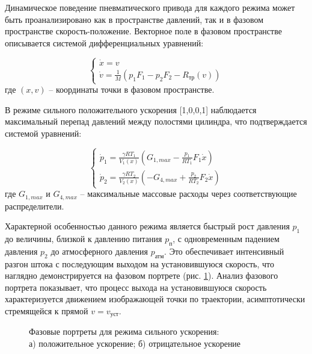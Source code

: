 Динамическое поведение пневматического привода для каждого режима может быть
проанализировано как в пространстве давлений, так и в фазовом пространстве
скорость-положение. Векторное поле в фазовом пространстве описывается системой дифференциальных уравнений:

\begin{equation}
	\begin{cases}
		\dot{x} = v \\
		\dot{v} = \frac{1}{M}(p_1F_1 - p_2F_2 - R_\text{тр}(v))
	\end{cases}
\end{equation}
где $(x,v)$ -- координаты точки в фазовом пространстве.

В режиме сильного положительного ускорения [1,0,0,1] наблюдается максимальный
перепад давлений между полостями цилиндра, что подтверждается системой уравнений:

\begin{equation*}
	\begin{cases}
		\dot{p}_1 = \frac{\gamma RT_1}{V_1(x)}\left(G_{1,max} - \frac{p_1}{RT_1}F_1\dot{x}\right) \\
		\dot{p}_2 = \frac{\gamma RT_2}{V_2(x)}\left(-G_{4,max} + \frac{p_2}{RT_2}F_2\dot{x}\right)
	\end{cases}
\end{equation*}
где $G_{1,max}$ и $G_{4,max}$ -- максимальные массовые расходы через соответствующие распределители.

Характерной особенностью данного режима является быстрый рост давления $p_1$ до величины, близкой к давлению питания
$p_\text{п}$, с одновременным падением давления $p_2$ до атмосферного давления $p_\text{атм}$. Это обеспечивает интенсивный
разгон штока с последующим выходом на установившуюся скорость, что наглядно демонстрируется на
фазовом портрете (рис. \ref{fig:pp_strong_accelration}). Анализ фазового портрета показывает,
что процесс выхода на установившуюся скорость характеризуется движением изображающей
точки по траектории, асимптотически стремящейся к прямой $v = v_\text{уст}$.

\begin{figure}[htbp]
	\caption{Фазовые портреты для режима сильного ускорения:\\
		а) положительное ускорение; б) отрицательное ускорение}
	\label{fig:pp_strong_accelration}
\end{figure}

